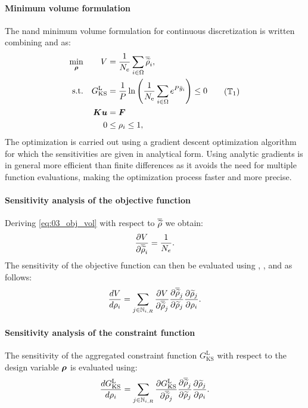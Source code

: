 \paragraph{Minimum volume formulation}
The \gls{nand} minimum volume formulation for continuous discretization is written combining  and  as:
\begin{equation}
    \begin{aligned}
    \min_{\bm{\rho}}         && V &= \frac{1}{N_{e}} \sum_{i \in \Omega} \rhophys_i,  \\
    \textrm{s.t.}   && G_{\text{KS}}^\text{L} &= \frac{1}{P} \ln{\left( \frac{1}{N_\text{e}} \sum_{i \in \Omega} e^{{P}\bar{g}_i} \right)} \leq 0 \\
    && \bm{K}\bm{u} &= \bm{F}\\
    && 0 &\leq \rho_i \leq 1, \\
    \end{aligned}
    \tag{$\mathbb{T}_1$}
    \label{eq:03_prob-stress}
\end{equation}
The optimization is carried out using a gradient descent optimization algorithm for which the sensitivities are given in analytical form. Using analytic gradients is in general more efficient than finite differences as it avoids the need for multiple function evaluations, making the optimization process faster and more precise.

\paragraph{Sensitivity analysis of the objective function}
Deriving \eqref{eq:03_obj_vol} with respect to $\overline{\widetilde{\rho}}$ we obtain:
\begin{equation}
    \frac{\partial V}{\partial\overline{\widetilde{\rho}}_i} = \frac{1}{N_{e}}.
    \label{eq:03_01}
\end{equation}
The sensitivity of the objective function can then be evaluated using  , , and  as follows:
\begin{equation}
    \frac{d V}{d \rho_i} = \sum_{j \in \mathbb{N}_{i,R}} \frac{\partial V}{\partial\overline{\widetilde{\rho}}_j} \frac{\partial\overline{\widetilde{\rho}}_j}{\partial\widetilde{\rho}_j} \frac{\partial\widetilde{\rho}_j}{\partial\rho_i}.
\end{equation}
\paragraph{Sensitivity analysis of the constraint function}
The sensitivity of the aggregated constraint function $G_{\text{KS}}^\text{L}$ with respect to the design variable $\bm{\rho}$ is evaluated using:
\begin{equation} \label{eq:03_chain_sens_fin}
    \frac{d G_{\text{KS}}^\text{L}}{d \rho_i} = \sum_{j \in \mathbb{N}_{i,R}} \frac{\partial G_{\text{KS}}^\text{L}}{\partial\overline{\widetilde{\rho}}_j} \frac{\partial\overline{\widetilde{\rho}}_j}{\partial\widetilde{\rho}_j} \frac{\partial\widetilde{\rho}_j}{\partial\rho_i}.
\end{equation}

